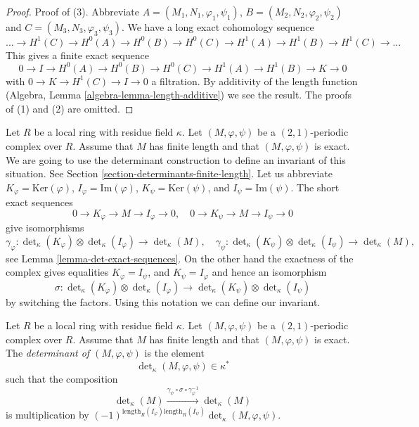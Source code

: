 \begin{proof}
Proof of (3). Abbreviate $A = (M_1, N_1, \varphi_1, \psi_1)$,
$B = (M_2, N_2, \varphi_2, \psi_2)$ and $C = (M_3, N_3, \varphi_3, \psi_3)$.
We have a long exact cohomology sequence
$$
\ldots
\to H^1(C)
\to H^0(A)
\to H^0(B)
\to H^0(C)
\to H^1(A)
\to H^1(B)
\to H^1(C)
\to \ldots
$$
This gives a finite exact sequence
$$
0 \to I
\to H^0(A)
\to H^0(B)
\to H^0(C)
\to H^1(A)
\to H^1(B)
\to K \to 0
$$
with $0 \to K \to H^1(C) \to I \to 0$ a filtration. By additivity of
the length function (Algebra, Lemma \ref{algebra-lemma-length-additive})
we see the result.
The proofs of (1) and (2) are omitted.
\end{proof}

\noindent
Let $R$ be a local ring with residue field $\kappa$.
Let $(M, \varphi, \psi)$ be a $(2, 1)$-periodic complex over $R$.
Assume that $M$ has finite length and that $(M, \varphi, \psi)$ is
exact. We are going to use the determinant construction to define
an invariant of this situation. See
Section \ref{section-determinants-finite-length}.
Let us abbreviate
$K_\varphi = \text{Ker}(\varphi)$,
$I_\varphi = \text{Im}(\varphi)$,
$K_\psi = \text{Ker}(\psi)$, and
$I_\psi = \text{Im}(\psi)$.
The short exact sequences
$$
0 \to K_\varphi \to M \to I_\varphi \to 0,\quad
0 \to K_\psi \to M \to I_\psi \to 0
$$
give isomorphisms
$$
\gamma_\varphi :
\det\nolimits_\kappa(K_\varphi)
\otimes
\det\nolimits_\kappa(I_\varphi)
\longrightarrow
\det\nolimits_\kappa(M), \quad
\gamma_\psi :
\det\nolimits_\kappa(K_\psi)
\otimes
\det\nolimits_\kappa(I_\psi)
\longrightarrow
\det\nolimits_\kappa(M),
$$
see Lemma \ref{lemma-det-exact-sequences}.
On the other hand the exactness of the complex gives equalities
$K_\varphi = I_\psi$, and $K_\psi = I_\varphi$
and hence an isomorphism
$$
\sigma :
\det\nolimits_\kappa(K_\varphi)
\otimes
\det\nolimits_\kappa(I_\varphi)
\longrightarrow
\det\nolimits_\kappa(K_\psi)
\otimes
\det\nolimits_\kappa(I_\psi)
$$
by switching the factors. Using this notation we can define our invariant.

\begin{definition}
\label{definition-periodic-determinant}
Let $R$ be a local ring with residue field $\kappa$.
Let $(M, \varphi, \psi)$ be a $(2, 1)$-periodic complex over $R$.
Assume that $M$ has finite length and that $(M, \varphi, \psi)$ is
exact. The {\it determinant of $(M, \varphi, \psi)$} is
the element
$$
\det\nolimits_\kappa(M, \varphi, \psi) \in \kappa^*
$$
such that the composition
$$
\det\nolimits_\kappa(M)
\xrightarrow{\gamma_\psi \circ \sigma \circ \gamma_\varphi^{-1}}
\det\nolimits_\kappa(M)
$$
is multiplication by
$(-1)^{\text{length}_R(I_\varphi)\text{length}_R(I_\psi)}
\det\nolimits_\kappa(M, \varphi, \psi)$.
\end{definition}

